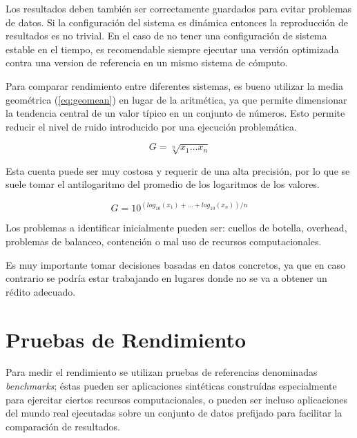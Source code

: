 \documentclass[a4paper]{report}
\begin{document}
Los resultados deben tambi\'en ser correctamente guardados para evitar
problemas de datos. Si la configuraci\'on del sistema es din\'amica entonces la
reproducci\'on de resultados es no trivial. En el caso de no tener una
configuraci\'on de sistema estable en el tiempo, es recomendable siempre
ejecutar una versi\'on optimizada contra una version de referencia en un mismo
sistema de c\'omputo.

\bigskip

Para comparar rendimiento entre diferentes sistemas, es bueno utilizar
la media geom\'etrica (\ref{eq:geomean}) en lugar de la aritm\'etica,
ya que permite dimensionar la tendencia central de un valor t\'ipico en un conjunto
de n\'umeros. Esto permite reducir el nivel de ruido introducido por una ejecuci\'on
problem\'atica.

\begin{equation}
\label{eq:geomean}
G = \sqrt[n]{x_{1} \ldots x_{n}}
\end{equation}

Esta cuenta puede ser muy costosa y requerir de una alta precisi\'on, por lo que se
suele tomar el antilogaritmo del promedio de los logaritmos de los valores.

\begin{equation}
\label{eq:geomean-log}
G = 10 ^{( log _{10} (x_{1}) + \ldots + log _{10} (x_{n}) ) / n}
\end{equation}

\bigskip

Los problemas a identificar inicialmente pueden ser: cuellos de botella,
overhead, problemas de balanceo, contenci\'on o mal uso de recursos
computacionales.

\bigskip

Es muy importante tomar decisiones basadas en datos concretos, ya que en
caso contrario se podr\'ia estar trabajando en lugares donde no se va a obtener
un r\'edito adecuado.

\section{Pruebas de Rendimiento}

Para medir el rendimiento se utilizan pruebas de referencias denominadas
{\em benchmarks}; \'estas pueden ser aplicaciones sint\'eticas constru\'idas
especialmente para ejercitar ciertos recursos computacionales, o pueden ser incluso
aplicaciones del mundo real ejecutadas sobre un conjunto de datos prefijado para
facilitar la comparaci\'on de resultados.
\end{document}
